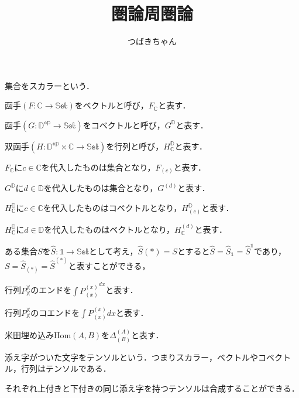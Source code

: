 \documentclass[a4j,12pt]{jarticle}
\title{圏論周圏論}
\author{つばきちゃん}
\theoremstyle{definition}
\numberwithin{equation}{section}
\newcommand{\1}{\mathbb{1}}
\newcommand{\2}{\mathbb{2}}
\renewcommand{\.}{\hspace{2mm}}
\begin{document}
\maketitle
\newpage

\tableofcontents
\clearpage

集合をスカラーという．

函手$(F:\mathbb{C}\rightarrow\mathbb{Set})$をベクトルと呼び，$F_\mathbb{C}$と表す．

函手$(G:\mathbb{D^{op}}\rightarrow\mathbb{Set})$をコベクトルと呼び，$G^\mathbb{D}$と表す．

双函手$(H:\mathbb{D^{op}\times\mathbb{C}}\rightarrow\mathbb{Set})$を行列と呼び，$H^\mathbb{D}_\mathbb{C}$と表す．

$F_\mathbb{C}$に$c\in \mathbb{C}$を代入したものは集合となり，$F_{(c)}$と表す．

$G^\mathbb{D}$に$d\in \mathbb{D}$を代入したものは集合となり，$G^{(d)}$と表す．

$H_\mathbb{C}^\mathbb{D}$に$c\in \mathbb{C}$を代入したものはコベクトルとなり，$H_{(c)}^\mathbb{D}$と表す．

$H_\mathbb{C}^\mathbb{D}$に$d\in \mathbb{D}$を代入したものはベクトルとなり，$H_\mathbb{C}^{(d)}$と表す．

ある集合$S$を$\hat{S}:\mathbb{1}\rightarrow\mathbb{Set}$として考え，$\hat{S}(*)=S$とすると$\hat{S}=\hat{S}_\mathbb{1}=\hat{S}^\mathbb{1}$であり，$S=\hat{S}_{(*)}=\hat{S}^{(*)}$と表すことができる，

行列$P_\mathbb{X}^\mathbb{X}$のエンドを$\displaystyle{\int P_{(x)}^{(x)}}^{dx}$と表す．

行列$P_\mathbb{X}^\mathbb{X}$のコエンドを$\displaystyle\int P_{(x)}^{(x)} dx$と表す．

米田埋め込み$\text{Hom}(A,B)$を$\Delta^{(A)}_{(B)}$と表す．

添え字がついた文字をテンソルという．つまりスカラー，ベクトルやコベクトル，行列はテンソルである．

それぞれ上付きと下付きの同じ添え字を持つテンソルは合成することができる．
\end{document}
